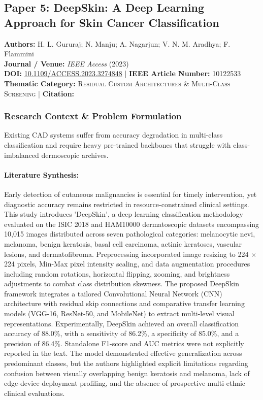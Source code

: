 \subsection{Paper 5: DeepSkin: A Deep Learning Approach for Skin Cancer Classification}
\label{sec:paper_5}

\begin{tcolorbox}[colback=gray!5!white,colframe=gray!75!black,title=\textbf{Metadata \& Citation Summary}]
\textbf{Authors:} H. L. Gururaj; N. Manju; A. Nagarjun; V. N. M. Aradhya; F. Flammini \\
\textbf{Journal / Venue:} \textit{IEEE Access} (2023) \\
\textbf{DOI:} \href{https://doi.org/10.1109/ACCESS.2023.3274848}{10.1109/ACCESS.2023.3274848} \quad | \quad \textbf{IEEE Article Number:} 10122533 \\
\textbf{Thematic Category:} \textsc{Residual Custom Architectures \& Multi-Class Screening} \quad | \quad \textbf{Citation:} \cite{10122533}
\end{tcolorbox}

\subsubsection*{Research Context \& Problem Formulation}
Existing CAD systems suffer from accuracy degradation in multi-class classification and require heavy pre-trained backbones that struggle with class-imbalanced dermoscopic archives.

\paragraph{Literature Synthesis:} Early detection of cutaneous malignancies is essential for timely intervention, yet diagnostic accuracy remains restricted in resource-constrained clinical settings. This study introduces 'DeepSkin', a deep learning classification methodology evaluated on the ISIC 2018 and HAM10000 dermatoscopic datasets encompassing 10,015 images distributed across seven pathological categories: melanocytic nevi, melanoma, benign keratosis, basal cell carcinoma, actinic keratoses, vascular lesions, and dermatofibroma. Preprocessing incorporated image resizing to 224 $\times$ 224 pixels, Min-Max pixel intensity scaling, and data augmentation procedures including random rotations, horizontal flipping, zooming, and brightness adjustments to combat class distribution skewness. The proposed DeepSkin framework integrates a tailored Convolutional Neural Network (CNN) architecture with residual skip connections and comparative transfer learning models (VGG-16, ResNet-50, and MobileNet) to extract multi-level visual representations. Experimentally, DeepSkin achieved an overall classification accuracy of 88.0\%, with a sensitivity of 86.2\%, a specificity of 85.0\%, and a precision of 86.4\%. Standalone F1-score and AUC metrics were not explicitly reported in the text. The model demonstrated effective generalization across predominant classes, but the authors highlighted explicit limitations regarding confusion between visually overlapping benign keratosis and melanoma, lack of edge-device deployment profiling, and the absence of prospective multi-ethnic clinical evaluations.


